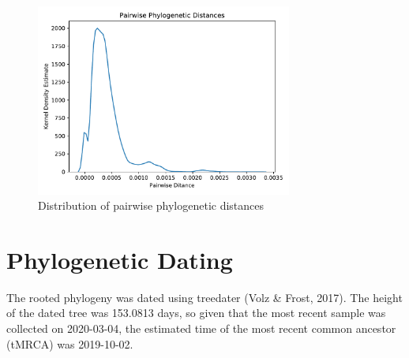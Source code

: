 \documentclass{article}
\begin{document}
\begin{figure}[h]
\centering
\includegraphics[width=0.75\textwidth,keepaspectratio]{./figs/pairwise_distances_tree.pdf}
\caption{Distribution of pairwise phylogenetic distances}
\end{figure}

\section{Phylogenetic Dating}
The rooted phylogeny was dated using treedater (Volz \& Frost, 2017).
The height of the dated tree was 153.0813 days,
so given that the most recent sample was collected on 2020-03-04,
the estimated time of the most recent common ancestor (tMRCA) was 2019-10-02.
\end{document}
